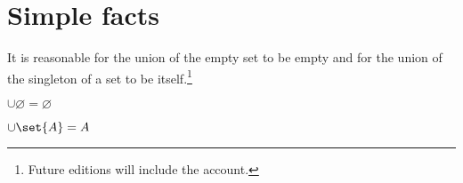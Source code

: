 \section*{Simple facts}

It is reasonable for the union of the empty set to be empty and for the union of the singleton of a set to be itself.\footnote{Future editions will include the account.}

\begin{proposition}
$\cup \varnothing = \varnothing$
\end{proposition}

%  


\begin{proposition}
$\cup \set{A} = A$
\end{proposition}

%  

